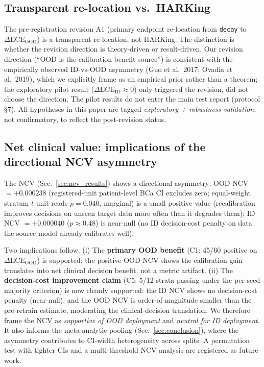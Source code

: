 \documentclass[final,5p,times,nonatbib]{elsarticle}
\begin{document}
\subsection{Transparent re-location vs.\ HARKing}
The pre-registration revision A1 (primary endpoint re-location from
\texttt{decay} to $\Delta\text{ECE}_{\text{OOD}}$) is a transparent
re-location, not HARKing. The distinction
\cite{lakens2019prereg,nosek2019prereg} is whether the revision
direction is theory-driven or
result-driven. Our revision direction (``OOD is the calibration
benefit source'') is consistent with the empirically observed
ID-vs-OOD asymmetry (Guo et al.\ 2017; Ovadia et al.\ 2019), which we
explicitly frame as an empirical prior rather than a theorem; the
exploratory pilot result ($\Delta\text{ECE}_{\text{ID}}\approx 0$)
only triggered the revision, did not choose the direction. The
pilot results do not enter the main test report (protocol \S7).
All hypotheses in this paper are tagged \emph{exploratory + robustness
validation}, not confirmatory, to reflect the post-revision status.

\subsection{Net clinical value: implications of the directional NCV asymmetry}
\label{sec:ncv_discussion}
The NCV (Sec.~\ref{sec:ncv_results}) shows a directional asymmetry: OOD
NCV $= +0.000238$ (registered-unit patient-level BCa CI excludes zero;
equal-weight stratum-$t$ unit reads $p = 0.040$, marginal) is a small
positive value
(recalibration improves decisions on unseen target data more often than it
degrades them); ID NCV $= +0.000040$ ($p \approx 0.48$) is near-null
(no ID decision-cost penalty on data the
source model already calibrates well).

Two implications follow. (i) The \textbf{primary OOD benefit}
(C1: 45/60 positive on $\Delta\text{ECE}_{\text{OOD}}$) is supported: the positive OOD NCV shows the
calibration gain translates into net clinical decision benefit, not a
metric artifact. (ii) The \textbf{decision-cost
improvement claim} (C5: 5/12 strata passing under the per-seed majority
criterion) is now cleanly supported: the ID NCV shows no
decision-cost penalty (near-null), and the OOD NCV is order-of-magnitude
smaller than the pre-retrain estimate, moderating the clinical-decision
translation. We therefore
frame the NCV as \emph{supportive of OOD deployment} and \emph{neutral
for ID deployment}. It also informs the meta-analytic pooling
(Sec.~\ref{sec:conclusion}), where the asymmetry contributes to CI-width
heterogeneity across splits. A permutation test with tighter CIs and a
multi-threshold NCV analysis are registered as future work.
\end{document}
